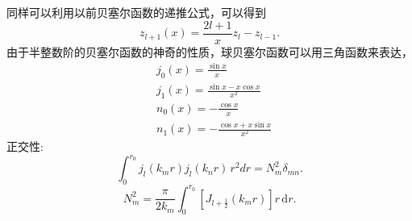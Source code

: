 \documentclass[12pt,a4paper,openany,twoside]{book}
\numberwithin{equation}{section}
\begin{document}
          同样可以利用以前贝塞尔函数的递推公式，可以得到
          \begin{equation}
            z_{l+1}(x) = \frac{2 l +1}{x} z_l - z_{l-1}
          .
          \end{equation} 
          由于半整数阶的贝塞尔函数的神奇的性质，球贝塞尔函数可以用三角函数来表达，
          \begin{align}
            &j_0(x) = \frac{\sin{x}}{x} \\
            &j_1(x) = \frac{\sin{x} - x \cos{x}}{x^2} \\
            &n_0(x) = -\frac{\cos{x}}{x} \\
            &n_1(x) = -\frac{\cos{x} + x\sin{x}}{x^2}
          \end{align}
          正交性:
          \begin{equation}
            \int _0^{r_0} j_l(k_m r) j_l(k_n r) \, r^2dr =N_m^2 \delta_{mn} 
          .
          \end{equation} 
          \begin{equation}
            N_m^2=\frac{\pi}{2k_m} \int ^{r_0}_0 [ J_{l+\frac{1}{2}}(k_mr)]  r\,\mathrm{d}r 
          .
          \end{equation} 
          
    
    
  
\end{document}
